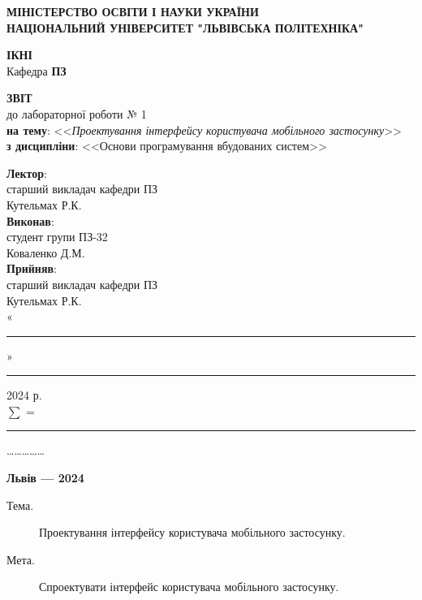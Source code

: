 \documentclass[oneside,14pt]{extarticle}
\newcommand\subject{Основи програмування вбудованих систем}
\newcommand\lecturer{старший викладач кафедри ПЗ\\Кутельмах Р.К.}
\newcommand\teacher{старший викладач кафедри ПЗ\\Кутельмах Р.К.}
\newcommand\mygroup{ПЗ-32}
\newcommand\lab{1}
\newcommand\theme{Проектування інтерфейсу користувача мобільного застосунку}
\newcommand\purpose{Спроектувати інтерфейс користувача мобільного застосунку}
\begin{document}
\begin{normalsize}
	\begin{titlepage}
		\thispagestyle{empty}
		\begin{center}
			\textbf{МІНІСТЕРСТВО ОСВІТИ І НАУКИ УКРАЇНИ\\
				НАЦІОНАЛЬНИЙ УНІВЕРСИТЕТ "ЛЬВІВСЬКА ПОЛІТЕХНІКА"}
		\end{center}
		\begin{flushright}
			\textbf{ІКНІ}\\
			Кафедра \textbf{ПЗ}
		\end{flushright}
		\vspace{80pt}
		\begin{center}
			\textbf{ЗВІТ}\\
			\vspace{10pt}
			до лабораторної роботи № \lab\\
			\textbf{на тему}: <<\textit{\theme}>>\\
			\textbf{з дисципліни}: <<\subject>>
		\end{center}
		\vspace{80pt}
		\begin{flushright}
			
			\textbf{Лектор}:\\
			\lecturer\\
			\vspace{28pt}
			\textbf{Виконав}:\\
			
			студент групи \mygroup\\
			Коваленко Д.М.\\
			\vspace{28pt}
			\textbf{Прийняв}:\\
			
			\teacher\\
			
			\vspace{28pt}
			«\rule{1cm}{0.15mm}» \rule{1.5cm}{0.15mm} 2024 р.\\
			$\sum$ = \rule{1cm}{0.15mm}……………\\
			
		\end{flushright}
		\vspace{\fill}
		\begin{center}
			\textbf{Львів — 2024}
		\end{center}
	\end{titlepage}
		
	\begin{description}
		\item[Тема.] \theme.
		\item[Мета.] \purpose.
	\end{description}


\end{normalsize}
\end{document}

